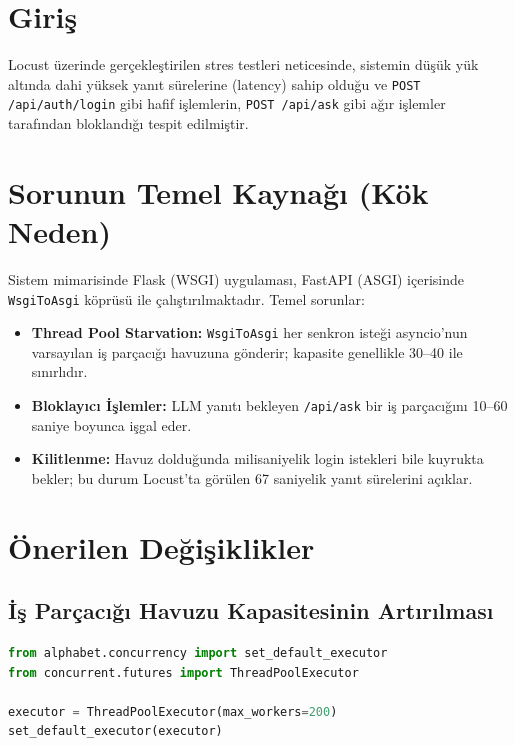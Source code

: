 \documentclass[12pt,a4paper]{article}
\begin{document}
\section{Giri\c{s}}
Locust \"{u}zerinde ger\c{c}ekle\c{s}tirilen stres testleri neticesinde, sistemin d\"{u}\c{s}\"{u}k y\"{u}k alt{\i}nda dahi
y\"{u}ksek yan{\i}t s\"{u}relerine (latency) sahip oldu\u{g}u ve \texttt{POST /api/auth/login} gibi hafif
i\c{s}lemlerin, \texttt{POST /api/ask} gibi a\u{g}{\i}r i\c{s}lemler taraf{\i}ndan blokland{\i}\u{g}{\i} tespit edilmi\c{s}tir.

\section{Sorunun Temel Kayna\u{g}{\i} (K\"{o}k Neden)}
Sistem mimarisinde Flask (WSGI) uygulamas{\i}, FastAPI (ASGI) i\c{c}erisinde \texttt{WsgiToAsgi}
k\"{o}pr\"{u}s\"{u} ile \c{c}al{\i}\c{s}t{\i}r{\i}lmaktad{\i}r. Temel sorunlar:

\begin{itemize}
  \item \textbf{Thread Pool Starvation:} \texttt{WsgiToAsgi} her senkron iste\u{g}i asyncio'nun varsay{\i}lan
        i\c{s} par\c{c}ac{\i}\u{g}{\i} havuzuna g\"{o}nderir; kapasite genellikle 30--40 ile s{\i}n{\i}rl{\i}d{\i}r.
  \item \textbf{Bloklay{\i}c{\i} \.{I}\c{s}lemler:} LLM yan{\i}t{\i} bekleyen \texttt{/api/ask} bir i\c{s} par\c{c}ac{\i}\u{g}{\i}n{\i}
        10--60 saniye boyunca i\c{s}gal eder.
  \item \textbf{Kilitlenme:} Havuz doldu\u{g}unda milisaniyelik login istekleri bile kuyrukta bekler;
        bu durum Locust'ta g\"{o}r\"{u}len 67 saniyelik yan{\i}t s\"{u}relerini a\c{c}{\i}klar.
\end{itemize}

\section{\"{O}nerilen De\u{g}i\c{s}iklikler}

\subsection{\.{I}\c{s} Par\c{c}ac{\i}\u{g}{\i} Havuzu Kapasitesinin Art{\i}r{\i}lmas{\i}}
\begin{lstlisting}[language=Python, caption={Thread Pool G\"{u}ncellemesi}]
from alphabet.concurrency import set_default_executor
from concurrent.futures import ThreadPoolExecutor

executor = ThreadPoolExecutor(max_workers=200)
set_default_executor(executor)
\end{lstlisting}
\end{document}
